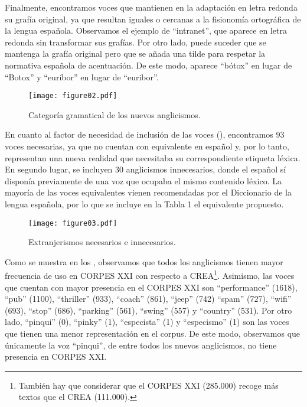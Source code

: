 \documentclass{textolivre}
\begin{document}
Finalmente, encontramos voces que mantienen en la adaptación en letra redonda su grafía original, ya que resultan iguales o cercanas a la fisionomía ortográfica de la lengua española. Observamos el ejemplo de “intranet”, que aparece en letra redonda sin transformar sus grafías. Por otro lado, puede suceder que se mantenga la grafía original pero que se añada una tilde para respetar la normativa española de acentuación. De este modo, aparece “bótox” en lugar de “Botox” y “euríbor” en lugar de “euribor”.

\begin{figure}[htbp]
 \centering
 \texttt{[image: figure02.pdf]}
 \caption{Categoría gramatical de los nuevos anglicismos.}
 \label{fig-02}
\end{figure}

En cuanto al factor de necesidad de inclusión de las voces (), encontramos 93 voces necesarias, ya que no cuentan con equivalente en español y, por lo tanto, representan una nueva realidad que necesitaba su correspondiente etiqueta léxica. En segundo lugar, se incluyen 30 anglicismos innecesarios, donde el español sí disponía previamente de una voz que ocupaba el mismo contenido léxico. La mayoría de las voces equivalentes vienen recomendadas por el Diccionario de la lengua española, por lo que se incluye en la Tabla 1 el equivalente propuesto. 

\begin{figure}[htbp]
 \centering
 \texttt{[image: figure03.pdf]}
 \caption{Extranjerismos necesarios e innecesarios.}
 \label{fig-03}
\end{figure}

Como se muestra en los , observamos que todos los anglicismos tienen mayor frecuencia de uso en CORPES XXI con respecto a CREA\footnote{
También hay que considerar que el CORPES XXI (285.000) recoge más textos que el CREA (111.000).
}. Asimismo, las voces que cuentan con mayor presencia en el CORPES XXI son “performance” (1618), “pub” (1100), “thriller” (933), “coach” (861), “jeep” (742) “spam” (727), “wifi” (693), “stop” (686), “parking” (561), “swing” (557) y “country” (531). Por otro lado, “pinqui” (0), “pinky” (1), “especista” (1) y “especismo” (1) son las voces que tienen una menor representación en el corpus. De este modo, observamos que únicamente la voz “pinqui”, de entre todos los nuevos anglicismos, no tiene presencia en CORPES XXI.
\end{document}
